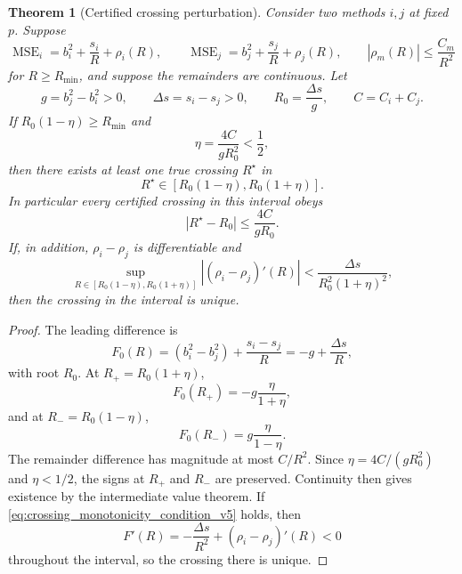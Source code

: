 \documentclass[11pt]{article}
\newtheorem{theorem}{Theorem}
\newcommand{\MSE}{\operatorname{MSE}}
\newcommand{\1}{\mathbf{1}}
\newcommand{\abs}[1]{\left\lvert #1 \right\rvert}
\begin{document}
\begin{theorem}[Certified crossing perturbation]
\label{thm:certified_crossing}
Consider two methods \(i,j\) at fixed \(p\).  Suppose
\begin{equation}
    \MSE_i=b_i^2+\frac{s_i}{R}+\rho_i(R),
    \qquad
    \MSE_j=b_j^2+\frac{s_j}{R}+\rho_j(R),
    \qquad
    \abs{\rho_m(R)}\leq\frac{C_m}{R^2}
\end{equation}
for \(R\geq R_{\min}\), and suppose the remainders are continuous.  Let
\begin{equation}
    g=b_j^2-b_i^2>0,
    \qquad
    \Delta s=s_i-s_j>0,
    \qquad
    R_0=\frac{\Delta s}{g},
    \qquad
    C=C_i+C_j.
\end{equation}
If \(R_0(1-\eta)\geq R_{\min}\) and
\begin{equation}
    \eta=\frac{4C}{gR_0^2}<\frac12,
    \label{eq:eta_crossing_condition}
\end{equation}
then there exists at least one true crossing \(R^\star\) in
\begin{equation}
    R^\star\in[R_0(1-\eta),R_0(1+\eta)].
    \label{eq:crossing_interval}
\end{equation}
In particular every certified crossing in this interval obeys
\begin{equation}
    \abs{R^\star-R_0}\leq \frac{4C}{gR_0}.
    \label{eq:crossing_shift_bound}
\end{equation}
If, in addition, \(\rho_i-\rho_j\) is differentiable and
\begin{equation}
    \sup_{R\in[R_0(1-\eta),R_0(1+\eta)]}
    \abs{(\rho_i-\rho_j)'(R)}
    <\frac{\Delta s}{R_0^2(1+\eta)^2},
    \label{eq:crossing_monotonicity_condition_v5}
\end{equation}
then the crossing in the interval is unique.
\end{theorem}

\begin{proof}
The leading difference is
\begin{equation}
    F_0(R)=\left(b_i^2-b_j^2\right)+\frac{s_i-s_j}{R}
    =-g+\frac{\Delta s}{R},
\end{equation}
with root \(R_0\).  At \(R_+=R_0(1+\eta)\),
\begin{equation}
    F_0(R_+)=-g\frac{\eta}{1+\eta},
\end{equation}
and at \(R_-=R_0(1-\eta)\),
\begin{equation}
    F_0(R_-)=g\frac{\eta}{1-\eta}.
\end{equation}
The remainder difference has magnitude at most \(C/R^2\).  Since \(\eta=4C/(gR_0^2)\) and \(\eta<1/2\), the signs at \(R_+\) and \(R_-\) are preserved.  Continuity then gives existence by the intermediate value theorem.  If \cref{eq:crossing_monotonicity_condition_v5} holds, then
\begin{equation}
    F'(R)=-\frac{\Delta s}{R^2}+(\rho_i-\rho_j)'(R)<0
\end{equation}
throughout the interval, so the crossing there is unique.
\end{proof}
\end{document}
